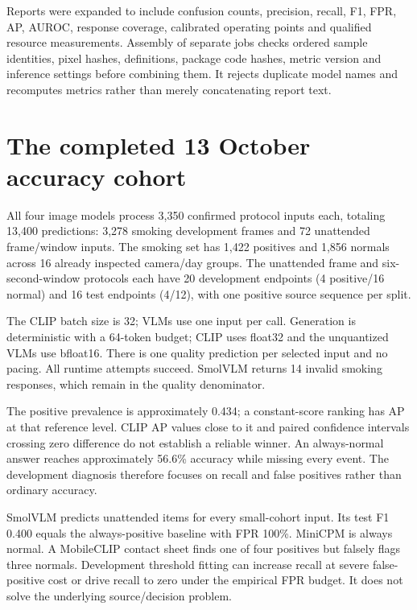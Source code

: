 Reports were expanded to include confusion counts, precision, recall, F1, FPR, AP, AUROC, response coverage, calibrated operating points and qualified resource measurements. Assembly of separate jobs checks ordered sample identities, pixel hashes, definitions, package code hashes, metric version and inference settings before combining them. It rejects duplicate model names and recomputes metrics rather than merely concatenating report text.

\section{The completed 13 October accuracy cohort}
All four image models process 3,350 confirmed protocol inputs each, totaling 13,400 predictions: 3,278 smoking development frames and 72 unattended frame/window inputs. The smoking set has 1,422 positives and 1,856 normals across 16 already inspected camera/day groups. The unattended frame and six-second-window protocols each have 20 development endpoints (4 positive/16 normal) and 16 test endpoints (4/12), with one positive source sequence per split.

The CLIP batch size is 32; VLMs use one input per call. Generation is deterministic with a 64-token budget; CLIP uses float32 and the unquantized VLMs use bfloat16. There is one quality prediction per selected input and no pacing. All runtime attempts succeed. SmolVLM returns 14 invalid smoking responses, which remain in the quality denominator.



The positive prevalence is approximately 0.434; a constant-score ranking has AP at that reference level. CLIP AP values close to it and paired confidence intervals crossing zero difference do not establish a reliable winner. An always-normal answer reaches approximately 56.6\% accuracy while missing every event. The development diagnosis therefore focuses on recall and false positives rather than ordinary accuracy.


SmolVLM predicts unattended items for every small-cohort input. Its test F1 0.400 equals the always-positive baseline with FPR 100\%. MiniCPM is always normal. A MobileCLIP contact sheet finds one of four positives but falsely flags three normals. Development threshold fitting can increase recall at severe false-positive cost or drive recall to zero under the empirical FPR budget. It does not solve the underlying source/decision problem.

